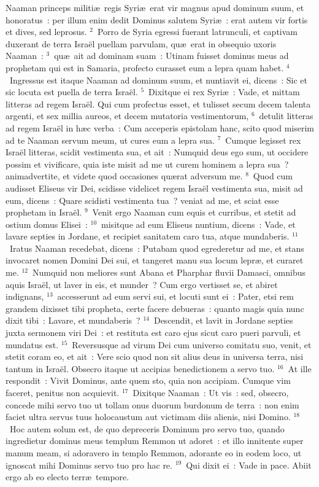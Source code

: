 \bchapter
\lettrine[lines=3,image=true,loversize=0.05,lraise=-0.03]{N}{}aaman princeps militi\ae\ regis Syri\ae\ erat vir magnus apud dominum suum, et honoratus~: per illum enim dedit Dominus salutem Syri\ae~: erat autem vir fortis et dives, sed leprosus.
${}^{2}$~Porro de Syria egressi fuerant latrunculi, et captivam duxerant de terra Isra\"el puellam parvulam, qu\ae\ erat in obsequio uxoris Naaman~:
${}^{3}$~qu\ae\ ait ad dominam suam~: Utinam fuisset dominus meus ad prophetam qui est in Samaria, profecto curasset eum a lepra quam habet.
${}^{4}$~Ingressus est itaque Naaman ad dominum suum, et nuntiavit ei, dicens~: Sic et sic locuta est puella de terra Isra\"el.
${}^{5}$~Dixitque ei rex Syri\ae~: Vade, et mittam litteras ad regem Isra\"el. Qui cum profectus esset, et tulisset secum decem talenta argenti, et sex millia aureos, et decem mutatoria vestimentorum,
${}^{6}$~detulit litteras ad regem Isra\"el in h\ae c verba~: Cum acceperis epistolam hanc, scito quod miserim ad te Naaman servum meum, ut cures eum a lepra sua.
${}^{7}$~Cumque legisset rex Isra\"el litteras, scidit vestimenta sua, et ait~: Numquid deus ego sum, ut occidere possim et vivificare, quia iste misit ad me ut curem hominem a lepra sua~? animadvertite, et videte quod occasiones qu\ae rat adversum me.
${}^{8}$~Quod cum audisset Eliseus vir Dei, scidisse videlicet regem Isra\"el vestimenta sua, misit ad eum, dicens~: Quare scidisti vestimenta tua~? veniat ad me, et sciat esse prophetam in Isra\"el.
${}^{9}$~Venit ergo Naaman cum equis et curribus, et stetit ad ostium domus Elisei~:
${}^{10}$~misitque ad eum Eliseus nuntium, dicens~: Vade, et lavare septies in Jordane, et recipiet sanitatem caro tua, atque mundaberis.
${}^{11}$~Iratus Naaman recedebat, dicens~: Putabam quod egrederetur ad me, et stans invocaret nomen Domini Dei sui, et tangeret manu sua locum lepr\ae , et curaret me.
${}^{12}$~Numquid non meliores sunt Abana et Pharphar fluvii Damasci, omnibus aquis Isra\"el, ut laver in eis, et munder~? Cum ergo vertisset se, et abiret indignans,
${}^{13}$~accesserunt ad eum servi sui, et locuti sunt ei~: Pater, etsi rem grandem dixisset tibi propheta, certe facere debueras~: quanto magis quia nunc dixit tibi~: Lavare, et mundaberis~?
${}^{14}$~Descendit, et lavit in Jordane septies juxta sermonem viri Dei~: et restituta est caro ejus sicut caro pueri parvuli, et mundatus est.
${}^{15}$~Reversusque ad virum Dei cum universo comitatu suo, venit, et stetit coram eo, et ait~: Vere scio quod non sit alius deus in universa terra, nisi tantum in Isra\"el. Obsecro itaque ut accipias benedictionem a servo tuo.
${}^{16}$~At ille respondit~: Vivit Dominus, ante quem sto, quia non accipiam. Cumque vim faceret, penitus non acquievit.
${}^{17}$~Dixitque Naaman~: Ut vis~: sed, obsecro, concede mihi servo tuo ut tollam onus duorum burdonum de terra~: non enim faciet ultra servus tuus holocaustum aut victimam diis alienis, nisi Domino.
${}^{18}$~Hoc autem solum est, de quo depreceris Dominum pro servo tuo, quando ingredietur dominus meus templum Remmon ut adoret~: et illo innitente super manum meam, si adoravero in templo Remmon, adorante eo in eodem loco, ut ignoscat mihi Dominus servo tuo pro hac re.
${}^{19}$~Qui dixit ei~: Vade in pace. Abiit ergo ab eo electo terr\ae\ tempore.


